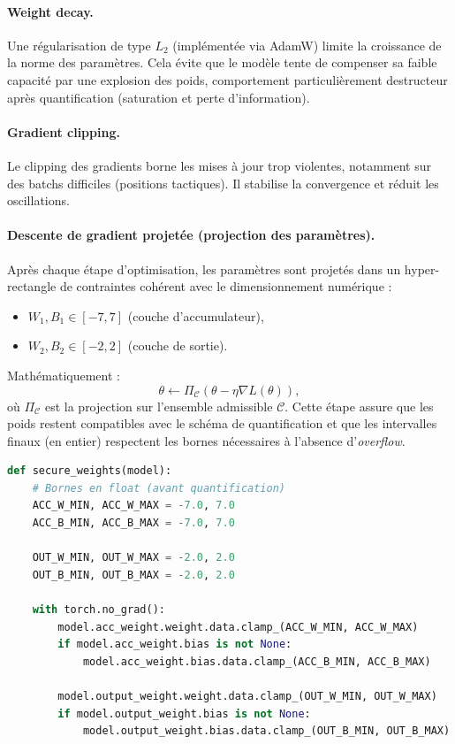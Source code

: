 \documentclass[11pt, a4paper]{article}
\begin{document}
\paragraph{Weight decay.}
Une régularisation de type $L_2$ (implémentée via AdamW) limite la croissance de la norme des paramètres. Cela évite que le modèle tente de compenser sa faible capacité par une explosion des poids, comportement particulièrement destructeur après quantification (saturation et perte d'information).

\paragraph{Gradient clipping.}
Le clipping des gradients borne les mises à jour trop violentes, notamment sur des batchs difficiles (positions tactiques). Il stabilise la convergence et réduit les oscillations.

\paragraph{Descente de gradient projetée (projection des paramètres).}
Après chaque étape d'optimisation, les paramètres sont projetés dans un hyper-rectangle de contraintes cohérent avec le dimensionnement numérique :
\begin{itemize}
    \item $W_1, B_1 \in [-7,7]$ (couche d'accumulateur),
    \item $W_2, B_2 \in [-2,2]$ (couche de sortie).
\end{itemize}
Mathématiquement :
\begin{equation}
    \theta \leftarrow \Pi_{\mathcal{C}}\left(\theta - \eta \nabla L(\theta)\right),
\end{equation}
où $\Pi_{\mathcal{C}}$ est la projection sur l'ensemble admissible $\mathcal{C}$. Cette étape assure que les poids restent compatibles avec le schéma de quantification et que les intervalles finaux (en entier) respectent les bornes nécessaires à l'absence d'\textit{overflow}.

\begin{lstlisting}[language=Python, caption={Projection des paramètres (\texttt{secure\_weights}) : descente de gradient projetée.}]
def secure_weights(model):
    # Bornes en float (avant quantification)
    ACC_W_MIN, ACC_W_MAX = -7.0, 7.0
    ACC_B_MIN, ACC_B_MAX = -7.0, 7.0

    OUT_W_MIN, OUT_W_MAX = -2.0, 2.0
    OUT_B_MIN, OUT_B_MAX = -2.0, 2.0

    with torch.no_grad():
        model.acc_weight.weight.data.clamp_(ACC_W_MIN, ACC_W_MAX)
        if model.acc_weight.bias is not None:
            model.acc_weight.bias.data.clamp_(ACC_B_MIN, ACC_B_MAX)

        model.output_weight.weight.data.clamp_(OUT_W_MIN, OUT_W_MAX)
        if model.output_weight.bias is not None:
            model.output_weight.bias.data.clamp_(OUT_B_MIN, OUT_B_MAX)
\end{lstlisting}
\end{document}
